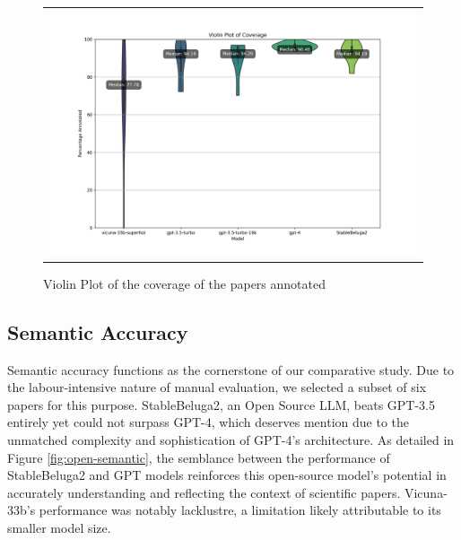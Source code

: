 \begin{figure}[htpb]
  \centering
  \begin{tabular}{c}
  \includegraphics[width=14cm]{images/open-coverage.png}
  \end{tabular}
  \caption[Open Source Coverage]{Violin Plot of the coverage of the papers annotated}\label{fig:open-coverage}
\end{figure}

\subsection{Semantic Accuracy}

Semantic accuracy functions as the cornerstone of our comparative study. Due to the labour-intensive nature of manual evaluation, we selected a subset of six papers for this purpose. StableBeluga2, an Open Source LLM, beats GPT-3.5 entirely yet could not surpass GPT-4, which deserves mention due to the unmatched complexity and sophistication of GPT-4's architecture. As detailed in Figure \ref{fig:open-semantic}, the semblance between the performance of StableBeluga2 and GPT models reinforces this open-source model's potential in accurately understanding and reflecting the context of scientific papers. Vicuna-33b's performance was notably lacklustre, a limitation likely attributable to its smaller model size.

